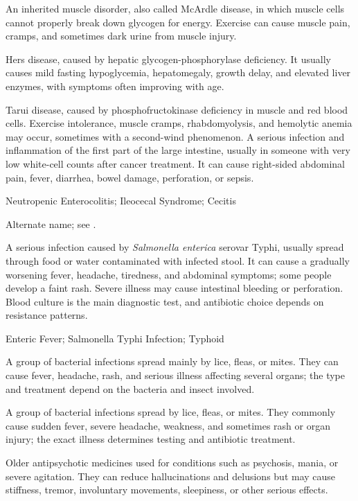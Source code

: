  An inherited muscle disorder, also called McArdle disease, in which muscle cells cannot properly break down glycogen for energy. Exercise can cause muscle pain, cramps, and sometimes dark urine from muscle injury.

 Hers disease, caused by hepatic glycogen-phosphorylase deficiency. It usually causes mild fasting hypoglycemia, hepatomegaly, growth delay, and elevated liver enzymes, with symptoms often improving with age.

 Tarui disease, caused by phosphofructokinase deficiency in muscle and red blood cells. Exercise intolerance, muscle cramps, rhabdomyolysis, and hemolytic anemia may occur, sometimes with a second-wind phenomenon.
 A serious infection and inflammation of the first part of the large intestine, usually in someone with very low white-cell counts after cancer treatment. It can cause right-sided abdominal pain, fever, diarrhea, bowel damage, perforation, or sepsis.

\synonyms
Neutropenic Enterocolitis; Ileocecal Syndrome; Cecitis

 Alternate name; see .

 A serious infection caused by \textit{Salmonella enterica} serovar Typhi, usually spread through food or water contaminated with infected stool. It can cause a gradually worsening fever, headache, tiredness, and abdominal symptoms; some people develop a faint rash. Severe illness may cause intestinal bleeding or perforation. Blood culture is the main diagnostic test, and antibiotic choice depends on resistance patterns.

\synonyms
Enteric Fever; Salmonella Typhi Infection; Typhoid

 A group of bacterial infections spread mainly by lice, fleas, or mites. They can cause fever, headache, rash, and serious illness affecting several organs; the type and treatment depend on the bacteria and insect involved.

 A group of bacterial infections spread by lice, fleas, or mites. They commonly cause sudden fever, severe headache, weakness, and sometimes rash or organ injury; the exact illness determines testing and antibiotic treatment.

 Older antipsychotic medicines used for conditions such as psychosis, mania, or severe agitation. They can reduce hallucinations and delusions but may cause stiffness, tremor, involuntary movements, sleepiness, or other serious effects.


